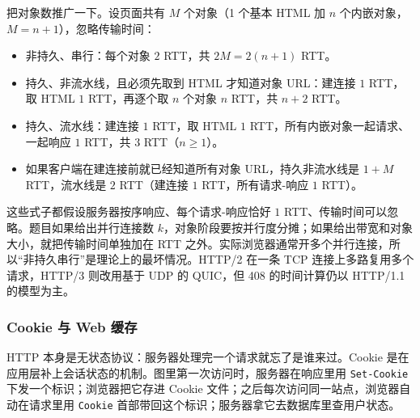 把对象数推广一下。设页面共有 $M$ 个对象（1 个基本 HTML 加 $n$ 个内嵌对象，$M=n+1$），忽略传输时间：

\begin{itemize}
  \item 非持久、串行：每个对象 $2$ RTT，共 $2M=2(n+1)$ RTT。
  \item 持久、非流水线，且必须先取到 HTML 才知道对象 URL：建连接 $1$ RTT，取 HTML $1$ RTT，再逐个取 $n$ 个对象 $n$ RTT，共 $n+2$ RTT。
  \item 持久、流水线：建连接 $1$ RTT，取 HTML $1$ RTT，所有内嵌对象一起请求、一起响应 $1$ RTT，共 $3$ RTT（$n\ge 1$）。
  \item 如果客户端在建连接前就已经知道所有对象 URL，持久非流水线是 $1+M$ RTT，流水线是 $2$ RTT（建连接 $1$ RTT，所有请求-响应 $1$ RTT）。
\end{itemize}

这些式子都假设服务器按序响应、每个请求-响应恰好 $1$ RTT、传输时间可以忽略。题目如果给出并行连接数 $k$，对象阶段要按并行度分摊；如果给出带宽和对象大小，就把传输时间单独加在 RTT 之外。实际浏览器通常开多个并行连接，所以“非持久串行”是理论上的最坏情况。HTTP/2 在一条 TCP 连接上多路复用多个请求，HTTP/3 则改用基于 UDP 的 QUIC，但 408 的时间计算仍以 HTTP/1.1 的模型为主。

\subsubsection{Cookie 与 Web 缓存}

HTTP 本身是无状态协议：服务器处理完一个请求就忘了是谁来过。Cookie 是在应用层补上会话状态的机制。图里第一次访问时，服务器在响应里用 \texttt{Set-Cookie} 下发一个标识；浏览器把它存进 Cookie 文件；之后每次访问同一站点，浏览器自动在请求里用 \texttt{Cookie} 首部带回这个标识；服务器拿它去数据库里查用户状态。


